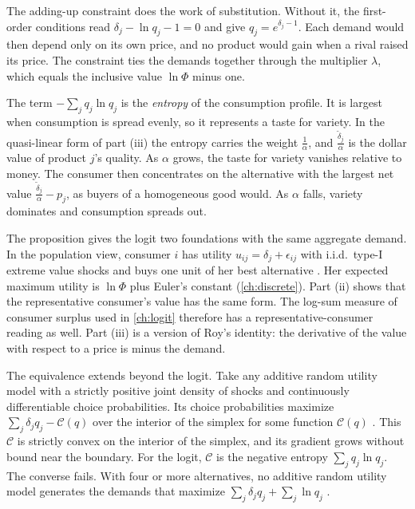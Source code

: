 The adding-up constraint does the work of substitution. Without it, the first-order conditions read
$\delta_j - \ln q_j - 1 = 0$ and give $q_j = e^{\delta_j - 1}$. Each demand would then depend only on its own
price, and no product would gain when a rival raised its price. The constraint ties the demands together through
the multiplier $\lambda$, which equals the inclusive value $\ln\Phi$ minus one.

The term $-\sum_jq_j\ln q_j$ is the \emph{entropy} of the consumption profile. It is largest when consumption is
spread evenly, so it represents a taste for variety. In the quasi-linear form of part (iii) the entropy carries
the weight $\frac{1}{\alpha}$, and $\frac{\tilde\delta_j}{\alpha}$ is the dollar value of product $j$'s quality. As
$\alpha$ grows, the taste for variety vanishes relative to money. The consumer then concentrates on the alternative
with the largest net value $\frac{\tilde\delta_j}{\alpha} - p_j$, as buyers of a homogeneous good would. As $\alpha$
falls, variety dominates and consumption spreads out.

The proposition gives the logit two foundations with the same aggregate demand. In the population view, consumer
$i$ has utility $u_{ij} = \delta_j + \epsilon_{ij}$ with i.i.d.\ type-I extreme value shocks and buys one unit of her
best alternative \citep{McFadden1974}. Her expected maximum utility is $\ln\Phi$ plus Euler's constant
(\cref{ch:discrete}). Part (ii) shows that the representative consumer's value has the same form. The log-sum
measure of consumer surplus used in \cref{ch:logit} therefore has a representative-consumer reading as well. Part
(iii) is a version of Roy's identity: the derivative of the value with respect to a price is minus the demand.

\begin{remark}\label{rem:04-perturbed}
The equivalence extends beyond the logit. Take any additive random utility model with a strictly positive joint
density of shocks and continuously differentiable choice probabilities. Its choice probabilities maximize
$\sum_j\delta_jq_j - \mathcal{C}(q)$ over the interior of the simplex for some function $\mathcal{C}(q)$
\citep[Theorem~2.1, p.~2269]{HofbauerSandholm2002}. This $\mathcal{C}$ is strictly convex on the interior of the simplex, and its gradient grows without
bound near the boundary. For the logit, $\mathcal{C}$ is the negative entropy $\sum_jq_j\ln q_j$. The converse fails. With four
or more alternatives, no additive random utility model generates the demands that maximize
$\sum_j\delta_jq_j + \sum_j\ln q_j$ \citep[Proposition~2.2, p.~2271]{HofbauerSandholm2002}.
\end{remark}

